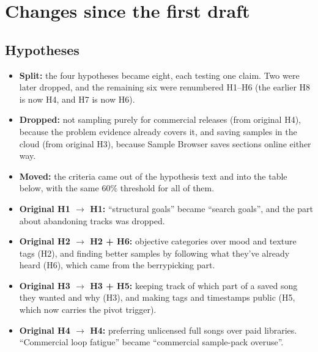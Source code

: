\documentclass[12pt,a4paper]{report}
\begin{document}
\section{Changes since the first draft}

\subsection{Hypotheses}
\begin{itemize}[leftmargin=*, itemsep=2pt]
\item \textbf{Split:} the four hypotheses became eight, each testing one claim. Two were later dropped, and the remaining six were renumbered H1–H6 (the earlier H8 is now H4, and H7 is now H6).
\item \textbf{Dropped:} not sampling purely for commercial releases (from original H4), because the problem evidence already covers it, and saving samples in the cloud (from original H3), because Sample Browser saves sections online either way.
\item \textbf{Moved:} the criteria came out of the hypothesis text and into the table below, with the same 60\% threshold for all of them.
\item \textbf{Original H1 $\rightarrow$ H1:} “structural goals” became “search goals”, and the part about abandoning tracks was dropped.
\item \textbf{Original H2 $\rightarrow$ H2 + H6:} objective categories over mood and texture tags (H2), and finding better samples by following what they’ve already heard (H6), which came from the berrypicking part.
\item \textbf{Original H3 $\rightarrow$ H3 + H5:} keeping track of which part of a saved song they wanted and why (H3), and making tags and timestamps public (H5, which now carries the pivot trigger).
\item \textbf{Original H4 $\rightarrow$ H4:} preferring unlicensed full songs over paid libraries. “Commercial loop fatigue” became “commercial sample-pack overuse”.
\end{itemize}
\end{document}
